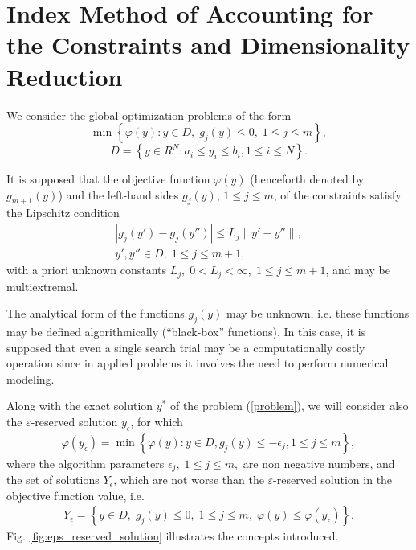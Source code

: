 \documentclass[twocolumn]{svjour3}          %
\begin{document}
\section{Index Method of Accounting for the Constraints and Dimensionality Reduction}
\label{sec:2}
	We consider the global optimization problems of the form
\begin{equation}\label{problem}
	\min{\left\{\varphi(y):y \in D, \; g_j(y)\leq 0, \; 1 \leq j \leq m\right\}},
\end{equation}
\begin{equation}\label{D}
	D=\left\{y\in R^N: a_i\leq y_i \leq b_i, 1\leq i \leq N\right\}.
\end{equation}

	It is supposed that the objective function $\varphi(y)$ (henceforth denoted by $g_{m+1}(y)$) and the left-hand sides $g_{j}(y)$, $1 \leq j \leq m$, of the constraints satisfy the Lipschitz condition
\begin{align}\label{lipschitz_condition}
	\left|g_j(y')-g_j (y'')\right| \leq L_j \|y'-y''\|, \nonumber \\ 
	y', y''\in D, \; 1\leq j \leq m+1,
\end{align}
with a priori unknown constants $L_j, \; 0<L_j<\infty, \; 1\leq j \leq m+1$, and may be multiextremal.

	The analytical form of the functions $g_{j}(y)$ may be unknown, i.e. these functions may be defined algorithmically (“black-box” functions). In this case, it is supposed that even a single search trial may be a computationally costly operation since in applied problems it involves the need to perform numerical modeling. 
	
	Along with the exact solution $y^\ast$ of the problem (\ref{problem}), we will consider also the $\varepsilon$-reserved solution $y_{\epsilon}$, for which 
\small
\begin{align}\label{epsilon_reserved_solution}
	\varphi(y_{\epsilon}) = \min{\left\{\varphi(y):y \in D, g_j(y)\leq -{\epsilon}_j, 1 \leq j \leq m\right\}},
\end{align}
\normalsize
where the algorithm parameters $\epsilon_j, \; 1\leq j \leq m,$ are non negative numbers, and the set of solutions $Y_{\epsilon}$, which are not worse than the $\varepsilon$-reserved solution in the objective function value, i.e.
\small
\begin{align}\label{Y_epsilon}
	Y_{\epsilon} = \left\{ y \in D, \; g_j(y) \leq 0, \; 1 \leq j \leq m, \; \varphi(y) \leq \varphi(y_{\epsilon}) \right\}.
\end{align}
\normalsize
Fig. \ref{fig:eps_reserved_solution} illustrates the concepts introduced.
\end{document}
